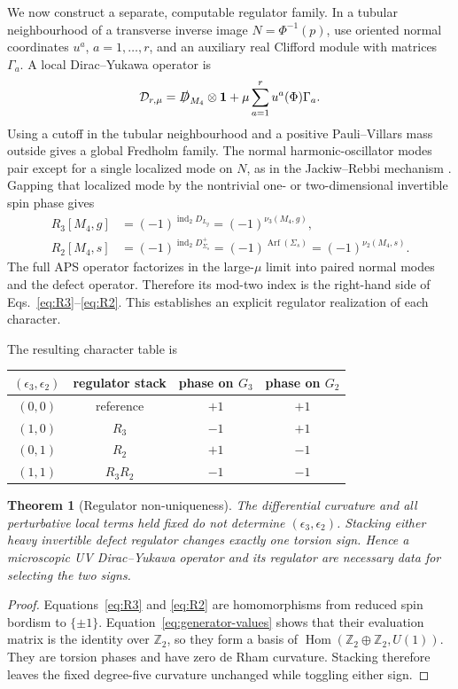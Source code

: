\documentclass[11pt]{article}
\newtheorem{theorem}{Theorem}[section]
\theoremstyle{definition}
\theoremstyle{remark}
\newcommand{\ZZ}{\mathbb Z}
\newcommand{\Arf}{\operatorname{Arf}}
\newcommand{\ind}{\operatorname{ind}}
\begin{document}
We now construct a separate, computable regulator family.  In a tubular
neighbourhood of a transverse inverse image \(N=\Phi^{-1}(p)\), use oriented
normal coordinates \(u^a\), \(a=1,\dots,r\), and an auxiliary real Clifford
module with matrices \(\Gamma_a\).  A local Dirac--Yukawa operator is
\begin{equation}
 \mathcal D_{r,\mu}
 =\slashed D_{M_4}\otimes\bm1
 +\mu\sum_{a=1}^{r}u^a(\Phi)\Gamma_a.
 \label{eq:defect-yukawa}
\end{equation}
Using a cutoff in the tubular neighbourhood and a positive Pauli--Villars
mass outside gives a global Fredholm family.  The normal harmonic-oscillator
modes pair except for a single localized mode on \(N\), as in the
Jackiw--Rebbi mechanism \cite{JackiwRebbi1976}.  Gapping that localized mode
by the nontrivial one- or two-dimensional invertible spin phase gives
\begin{align}
 R_3[M_4,g]&=(-1)^{\ind_2D_{L_g}}
            =(-1)^{\nu_3(M_4,g)},
 \label{eq:R3}\\
 R_2[M_4,s]&=(-1)^{\ind_2D^+_{\Sigma_s}}
            =(-1)^{\Arf(\Sigma_s)}
            =(-1)^{\nu_2(M_4,s)}.
 \label{eq:R2}
\end{align}
The full APS operator factorizes in the large-\(\mu\) limit into paired
normal modes and the defect operator.  Therefore its mod-two index is the
right-hand side of Eqs.~\eqref{eq:R3}--\eqref{eq:R2}.  This establishes an
explicit regulator realization of each character.

The resulting character table is
\begin{center}
\begin{tabular}{cccc}
\toprule
\((\epsilon_3,\epsilon_2)\) & regulator stack & phase on \(G_3\) & phase on \(G_2\)\\
\midrule
\((0,0)\) & reference & \(+1\) & \(+1\)\\
\((1,0)\) & \(R_3\) & \(-1\) & \(+1\)\\
\((0,1)\) & \(R_2\) & \(+1\) & \(-1\)\\
\((1,1)\) & \(R_3R_2\) & \(-1\) & \(-1\)\\
\bottomrule
\end{tabular}
\end{center}

\begin{theorem}[Regulator non-uniqueness]
The differential curvature and all perturbative local terms held fixed do
not determine \((\epsilon_3,\epsilon_2)\).  Stacking either heavy invertible
defect regulator changes exactly one torsion sign.  Hence a microscopic UV
Dirac--Yukawa operator and its regulator are necessary data for selecting the
two signs.
\end{theorem}
\begin{proof}
Equations~\eqref{eq:R3} and \eqref{eq:R2} are homomorphisms from reduced spin
bordism to \(\{\pm1\}\).  Equation~\eqref{eq:generator-values} shows that
their evaluation matrix is the identity over \(\ZZ_2\), so they form a basis
of
\(\operatorname{Hom}(\ZZ_2\oplus\ZZ_2,U(1))\).  They are torsion phases and
have zero de Rham curvature.  Stacking therefore leaves the fixed
degree-five curvature unchanged while toggling either sign.
\end{proof}
\end{document}
